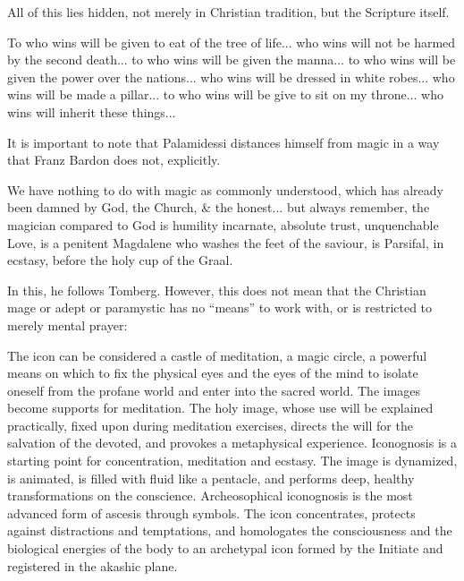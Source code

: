 All of this lies hidden, not merely in Christian tradition, but the Scripture itself.

\begin{quotex}
To who wins will be given to eat of the tree of life... who wins will not be harmed by the second death... to who wins will be given the manna... to who wins will be given the power over the nations... who wins will be dressed in white robes... who wins will be made a pillar... to who wins will be give to sit on my throne... who wins will inherit these things... 
\end{quotex}


It is important to note that Palamidessi distances himself from magic in a way that Franz Bardon does not, explicitly.

\begin{quotex}
We have nothing to do with magic as commonly understood, which has already been damned by God, the Church, \& the honest... but always remember, the magician compared to God is humility incarnate, absolute trust, unquenchable Love, is a penitent Magdalene who washes the feet of the saviour, is Parsifal, in ecstasy, before the holy cup of the Graal.
\end{quotex}


In this, he follows Tomberg. However, this does not mean that the Christian mage or adept or paramystic has no ``means'' to work with, or is restricted to merely mental prayer:

\begin{quotex}
The icon can be considered a castle of meditation, a magic circle, a powerful means on which to fix the physical eyes and the eyes of the mind to isolate oneself from the profane world and enter into the sacred world. The images become supports for meditation. The holy image, whose use will be explained practically, fixed upon during meditation exercises, directs the will for the salvation of the devoted, and provokes a metaphysical experience. Iconognosis is a starting point for concentration, meditation and ecstasy. The image is dynamized, is animated, is filled with fluid like a pentacle, and performs deep, healthy transformations on the conscience. Archeosophical iconognosis is the most advanced form of ascesis through symbols. The icon concentrates, protects against distractions and temptations, and homologates the consciousness and the biological energies of the body to an archetypal icon formed by the Initiate and registered in the akashic plane.
\end{quotex}


